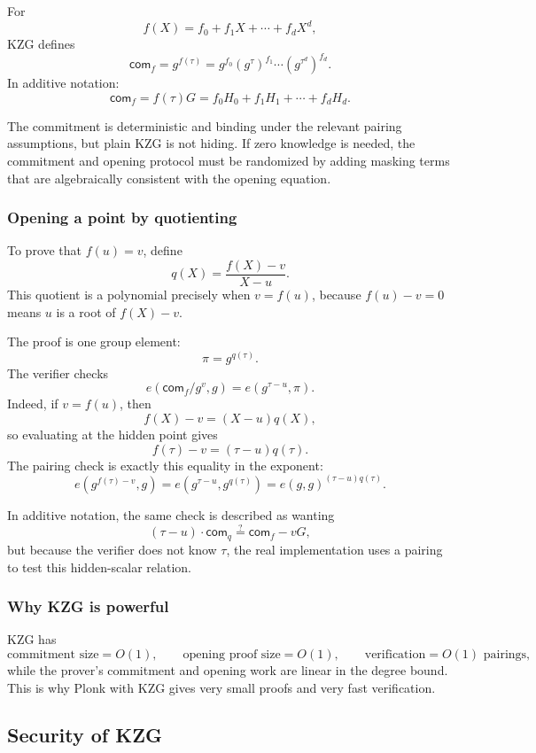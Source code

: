 \documentclass[11pt]{article}
\begin{document}
For
\[
    f(X)=f_0+f_1X+\cdots+f_dX^d,
\]
KZG defines
\[
    \mathsf{com}_f=g^{f(\tau)}
    =g^{f_0}(g^\tau)^{f_1}\cdots (g^{\tau^d})^{f_d}.
\]
In additive notation:
\[
    \mathsf{com}_f=f(\tau)G=f_0H_0+f_1H_1+\cdots+f_dH_d.
\]

The commitment is deterministic and binding under the relevant pairing assumptions, but plain KZG is not hiding. If zero knowledge is needed, the commitment and opening protocol must be randomized by adding masking terms that are algebraically consistent with the opening equation.

\subsubsection{Opening a point by quotienting}

To prove that $f(u)=v$, define
\[
    q(X)=\frac{f(X)-v}{X-u}.
\]
This quotient is a polynomial precisely when $v=f(u)$, because $f(u)-v=0$ means $u$ is a root of $f(X)-v$.

The proof is one group element:
\[
    \pi=g^{q(\tau)}.
\]
The verifier checks
\[
    e(\mathsf{com}_f/g^v,g)=e(g^{\tau-u},\pi).
\]
Indeed, if $v=f(u)$, then
\[
    f(X)-v=(X-u)q(X),
\]
so evaluating at the hidden point gives
\[
    f(\tau)-v=(\tau-u)q(\tau).
\]
The pairing check is exactly this equality in the exponent:
\[
    e(g^{f(\tau)-v},g)=e(g^{\tau-u},g^{q(\tau)})=e(g,g)^{(\tau-u)q(\tau)}.
\]

In additive notation, the same check is described as wanting
\[
    (\tau-u)\cdot \mathsf{com}_q \stackrel{?}{=} \mathsf{com}_f-vG,
\]
but because the verifier does not know $\tau$, the real implementation uses a pairing to test this hidden-scalar relation.

\subsubsection{Why KZG is powerful}

KZG has
\[
    \text{commitment size}=O(1),
    \qquad
    \text{opening proof size}=O(1),
    \qquad
    \text{verification}=O(1)\text{ pairings},
\]
while the prover's commitment and opening work are linear in the degree bound. This is why Plonk with KZG gives very small proofs and very fast verification.

\subsection{Security of KZG}
\end{document}
